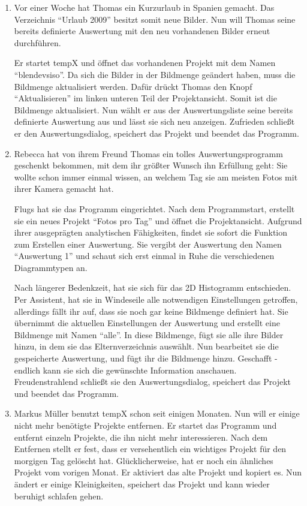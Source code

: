 \begin{enumerate}
	\item Vor einer Woche hat Thomas ein Kurzurlaub in Spanien gemacht. Das Verzeichnis "`Urlaub 2009"' besitzt somit neue Bilder. Nun will Thomas seine bereits definierte Auswertung mit den neu vorhandenen Bilder erneut durchführen.\par
	Er startet \gls{tempX} und öffnet das vorhandenen Projekt mit dem Namen "`blendevsiso"'. Da sich die Bilder in der Bildmenge geändert haben, muss die Bildmenge aktualisiert werden. Dafür drückt Thomas den Knopf "`Aktualisieren"' im linken unteren Teil der Projektansicht.  Somit ist die Bildmenge aktualisiert. Nun wählt er aus der Auswertungsliste seine bereits definierte Auswertung aus und lässt sie sich neu anzeigen. Zufrieden schließt er den Auswertungsdialog, speichert das Projekt und beendet das Programm.

	\item Rebecca hat von ihrem Freund Thomas ein tolles Auswertungsprogramm geschenkt bekommen, mit dem ihr größter Wunsch ihn Erfüllung geht: Sie wollte schon immer einmal wissen, an welchem Tag sie am meisten Fotos mit ihrer Kamera gemacht hat.\par
	Flugs hat sie das Programm eingerichtet. Nach dem Programmstart, erstellt sie ein neues Projekt "`Fotos pro Tag"' und öffnet die Projektansicht. Aufgrund ihrer ausgeprägten analytischen Fähigkeiten, findet sie sofort die Funktion zum Erstellen einer Auswertung. Sie vergibt der Auswertung den Namen "`Auswertung 1"' und schaut sich erst einmal in Ruhe die verschiedenen Diagrammtypen an.\par
	Nach längerer Bedenkzeit, hat sie sich für das 2D Histogramm entschieden. Per Assistent, hat sie in Windeseile alle notwendigen Einstellungen getroffen, allerdings fällt ihr auf, dass sie noch gar keine Bildmenge definiert hat. Sie übernimmt die aktuellen Einstellungen der Auswertung und erstellt eine Bildmenge mit Namen "`alle"'. In diese Bildmenge, fügt sie alle ihre Bilder hinzu, in dem sie das Elternverzeichnis auswählt. Nun bearbeitet sie die gespeicherte Auswertung, und fügt ihr die Bildmenge hinzu. Geschafft - endlich kann sie sich die gewünschte Information anschauen. Freudenstrahlend schließt sie den Auswertungsdialog, speichert das Projekt und beendet das Programm.
	
	\item Markus Müller benutzt \gls{tempX} schon seit einigen Monaten. Nun will er einige nicht mehr benötigte Projekte entfernen. Er startet das Programm und entfernt einzeln Projekte, die ihn nicht mehr interessieren. Nach dem Entfernen stellt er fest, dass er versehentlich ein wichtiges Projekt für den morgigen Tag gelöscht hat. Glücklicherweise, hat er noch ein ähnliches Projekt vom vorigen Monat. Er aktiviert das alte Projekt und kopiert es. Nun ändert er einige Kleinigkeiten, speichert das Projekt und kann wieder beruhigt schlafen gehen.
	

\end{enumerate}
